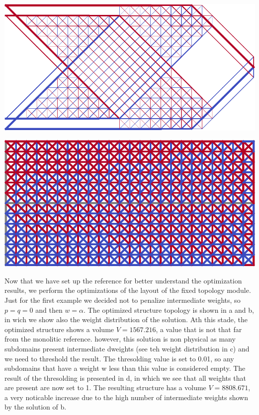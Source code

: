 \begin{marginfigure}
    \centering
    \includegraphics[width=\linewidth]{figures/06_DMO/00_cantilever_extremes/mono.pdf}
    \caption{$V=832.848$}
    \label{fig:06_cant_mono}
\end{marginfigure}


\begin{marginfigure}
    \centering
    \includegraphics[width=\linewidth]{figures/06_DMO/00_cantilever_extremes/cell.pdf}
    \caption{$V=9832.935$}
    \label{fig:06_cant_BC_cell}
\end{marginfigure}

Now that we have set up the reference for better understand the optimization results, we perform the optimizations of the layout of the fixed topology module. Just for the first example we decided not to penalize intermediate weights, so $p=q=0$ and then $w=\alpha$. The optimized structure topology is shown in a and b, in wich we show also the weight distribution of the solution. Ath this stade, the optimized structure shows a volume $V = 1567.216$, a value that is not that far from the monolitic reference. however, this solution is non physical as many subdomains present intermediate dweights (see teh weight distribution in c) and we need to threshold the result. The thresolding value is set to 0.01, so any subdomains that have a weight w less than this value is considered empty. The result of the thresolding is presented in d, in which we see that all weights that are present are now set to 1. The resulting structure has a volume $V = 8808.671$, a very noticable increase due to the high number of intermediate weights shown by the solution of b.

